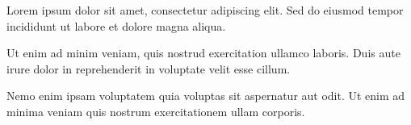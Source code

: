 



Lorem ipsum dolor sit amet, consectetur adipiscing elit.%
Sed do eiusmod tempor incididunt ut labore et dolore magna aliqua.

\smallskip
Ut enim ad minim veniam, quis nostrud exercitation ullamco laboris.%
Duis aute irure dolor in reprehenderit in voluptate velit esse cillum.

\smallskip
Nemo enim ipsam voluptatem quia voluptas sit aspernatur aut odit.%
Ut enim ad minima veniam quis nostrum exercitationem ullam corporis.

\bye                                      %

